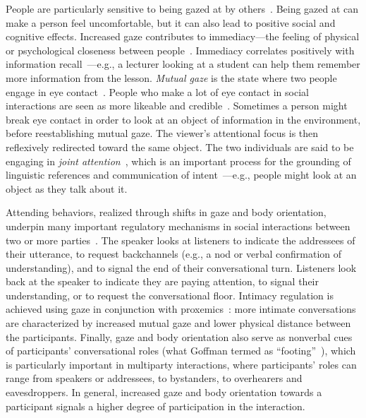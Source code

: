People are particularly sensitive to being gazed at by others~\cite{argyle1976gaze}. Being gazed at can make a person feel uncomfortable, but it can also lead to positive social and cognitive effects. Increased gaze contributes to immediacy---the feeling of physical or psychological closeness between people~\cite{mehrabian1966immediacy}. Immediacy correlates positively with information recall~\cite{otteson1980effect,sherwood1987facilitative,fullwood2006effect,kelley1988effects}---e.g., a lecturer looking at a student can help them remember more information from the lesson.
\emph{Mutual gaze} is the state where two people engage in eye contact~\cite{argyle1976gaze}. People who make a lot of eye contact in social interactions are seen as more likeable and credible~\cite{beebe1976effects,argyle1976gaze}. Sometimes a person might break eye contact in order to look at an object of information in the environment, before reestablishing mutual gaze. The viewer's attentional focus is then reflexively redirected toward the same object. The two individuals are said to be engaging in \emph{joint attention}~\cite{dentremont2007early}, which is an important process for the grounding of linguistic references and communication of intent~\cite{Hanna and Brennan 2007, Preissler and Carey 2005,mumme2007actions}---e.g., people might look at an object as they talk about it.

Attending behaviors, realized through shifts in gaze and body orientation, underpin many important regulatory mechanisms in social interactions between two or more parties~\cite{heylen2006head}. The speaker looks at listeners to indicate the addressees of their utterance, to request backchannels (e.g., a nod or verbal confirmation of understanding), and to signal the end of their conversational turn. Listeners look back at the speaker to indicate they are paying attention, to signal their understanding, or to request the conversational floor. Intimacy regulation is achieved using gaze in conjunction with proxemics~\cite{argyle1965eyecontact}: more intimate conversations are characterized by increased mutual gaze and lower physical distance between the participants. Finally, gaze and body orientation also serve as nonverbal cues of participants' conversational roles (what Goffman termed as ``footing''~\cite{goffman1979footing}), which is particularly important in multiparty interactions, where participants' roles can range from speakers or addressees, to bystanders, to overhearers and eavesdroppers. In general, increased gaze and body orientation towards a participant signals a higher degree of participation in the interaction.

